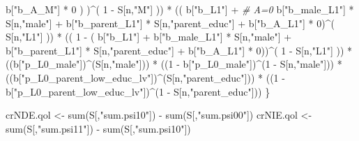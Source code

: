 \documentclass[
]{book}
\newenvironment{Shaded}{\begin{snugshade}}{\end{snugshade}}
\newcommand{\CommentTok}[1]{\textcolor[rgb]{0.56,0.35,0.01}{\textit{#1}}}
\newcommand{\DecValTok}[1]{\textcolor[rgb]{0.00,0.00,0.81}{#1}}
\newcommand{\FunctionTok}[1]{\textcolor[rgb]{0.00,0.00,0.00}{#1}}
\newcommand{\NormalTok}[1]{#1}
\newcommand{\OtherTok}[1]{\textcolor[rgb]{0.56,0.35,0.01}{#1}}
\newcommand{\SpecialCharTok}[1]{\textcolor[rgb]{0.00,0.00,0.00}{#1}}
\newcommand{\StringTok}[1]{\textcolor[rgb]{0.31,0.60,0.02}{#1}}
\begin{document}
\begin{Shaded}
\begin{Highlighting}[]
\NormalTok{                b[}\StringTok{"b\_A\_M"}\NormalTok{] }\SpecialCharTok{*} \DecValTok{0}\NormalTok{ ) )}\SpecialCharTok{\^{}}\NormalTok{( }\DecValTok{1} \SpecialCharTok{{-}}\NormalTok{ S[n,}\StringTok{"M"}\NormalTok{] )) }\SpecialCharTok{*}
\NormalTok{      (( b[}\StringTok{"b\_L1"}\NormalTok{] }\SpecialCharTok{+}                                                            \CommentTok{\# A=0}
\NormalTok{           b[}\StringTok{"b\_male\_L1"}\NormalTok{] }\SpecialCharTok{*}\NormalTok{ S[n,}\StringTok{"male"}\NormalTok{] }\SpecialCharTok{+}  
\NormalTok{           b[}\StringTok{"b\_parent\_L1"}\NormalTok{] }\SpecialCharTok{*}\NormalTok{ S[n,}\StringTok{"parent\_educ"}\NormalTok{] }\SpecialCharTok{+}
\NormalTok{           b[}\StringTok{"b\_A\_L1"}\NormalTok{] }\SpecialCharTok{*} \DecValTok{0}\NormalTok{)}\SpecialCharTok{\^{}}\NormalTok{( S[n,}\StringTok{"L1"}\NormalTok{] )) }\SpecialCharTok{*}
\NormalTok{      (( }\DecValTok{1} \SpecialCharTok{{-}}\NormalTok{ ( b[}\StringTok{"b\_L1"}\NormalTok{] }\SpecialCharTok{+}
\NormalTok{                 b[}\StringTok{"b\_male\_L1"}\NormalTok{] }\SpecialCharTok{*}\NormalTok{ S[n,}\StringTok{"male"}\NormalTok{] }\SpecialCharTok{+}  
\NormalTok{                 b[}\StringTok{"b\_parent\_L1"}\NormalTok{] }\SpecialCharTok{*}\NormalTok{ S[n,}\StringTok{"parent\_educ"}\NormalTok{] }\SpecialCharTok{+}
\NormalTok{                 b[}\StringTok{"b\_A\_L1"}\NormalTok{] }\SpecialCharTok{*} \DecValTok{0}\NormalTok{))}\SpecialCharTok{\^{}}\NormalTok{( }\DecValTok{1} \SpecialCharTok{{-}}\NormalTok{ S[n,}\StringTok{"L1"}\NormalTok{] )) }\SpecialCharTok{*}
\NormalTok{      ((b[}\StringTok{"p\_L0\_male"}\NormalTok{])}\SpecialCharTok{\^{}}\NormalTok{(S[n,}\StringTok{"male"}\NormalTok{])) }\SpecialCharTok{*} 
\NormalTok{      ((}\DecValTok{1} \SpecialCharTok{{-}}\NormalTok{ b[}\StringTok{"p\_L0\_male"}\NormalTok{])}\SpecialCharTok{\^{}}\NormalTok{(}\DecValTok{1} \SpecialCharTok{{-}}\NormalTok{ S[n,}\StringTok{"male"}\NormalTok{])) }\SpecialCharTok{*} 
\NormalTok{      ((b[}\StringTok{"p\_L0\_parent\_low\_educ\_lv"}\NormalTok{])}\SpecialCharTok{\^{}}\NormalTok{(S[n,}\StringTok{"parent\_educ"}\NormalTok{])) }\SpecialCharTok{*}
\NormalTok{      ((}\DecValTok{1} \SpecialCharTok{{-}}\NormalTok{ b[}\StringTok{"p\_L0\_parent\_low\_educ\_lv"}\NormalTok{])}\SpecialCharTok{\^{}}\NormalTok{(}\DecValTok{1} \SpecialCharTok{{-}}\NormalTok{ S[n,}\StringTok{"parent\_educ"}\NormalTok{])) }
\NormalTok{    \}}
  
\NormalTok{  crNDE.qol }\OtherTok{\textless{}{-}} \FunctionTok{sum}\NormalTok{(S[,}\StringTok{"sum.psi10"}\NormalTok{]) }\SpecialCharTok{{-}} \FunctionTok{sum}\NormalTok{(S[,}\StringTok{"sum.psi00"}\NormalTok{])}
\NormalTok{  crNIE.qol }\OtherTok{\textless{}{-}} \FunctionTok{sum}\NormalTok{(S[,}\StringTok{"sum.psi11"}\NormalTok{]) }\SpecialCharTok{{-}} \FunctionTok{sum}\NormalTok{(S[,}\StringTok{"sum.psi10"}\NormalTok{])}
  

\end{Highlighting}
\end{Shaded}
\end{document}
